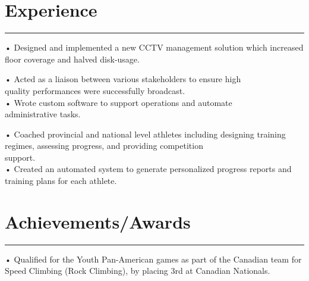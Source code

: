 \documentclass[]{resume}
\begin{document}
\begin{minipage}[t]{0.66\textwidth}
\section{Experience}
\noindent\rule{12.5cm}{0.4pt}
 
\noindent
\hspace{3em}%
\begin{minipage}{0.85\textwidth\vspace{2pt}}
• Designed and implemented a new CCTV management solution which increased floor coverage and halved disk-usage.
\end{minipage}
\sectionsep

 
\noindent
\hspace{3em}%
\begin{minipage}{0.85\textwidth\vspace{2pt}}
• Acted as a liaison between various stakeholders to ensure high\\quality performances were successfully broadcast.\\
• Wrote custom software to support operations and automate\\administrative tasks.
\end{minipage}
\sectionsep

 
\noindent
\hspace{3em}%
\begin{minipage}{0.85\textwidth\vspace{2pt}}
• Coached provincial and national level athletes including designing training regimes, assessing progress, and providing competition\\support.\\
• Created an automated system to generate personalized progress reports and training plans for each athlete.
\end{minipage}
\sectionsep

\section{Achievements/Awards} 
\noindent\rule{12.5cm}{0.4pt}

 
\descript{}
\noindent
\hspace{3em}%
\begin{minipage}{0.85\textwidth\vspace{2pt}}
• Qualified for the Youth Pan-American games as part of the Canadian team for Speed Climbing (Rock Climbing), by placing 3rd at Canadian Nationals. 
\end{minipage}
\sectionsep


\end{minipage}
\end{document}

